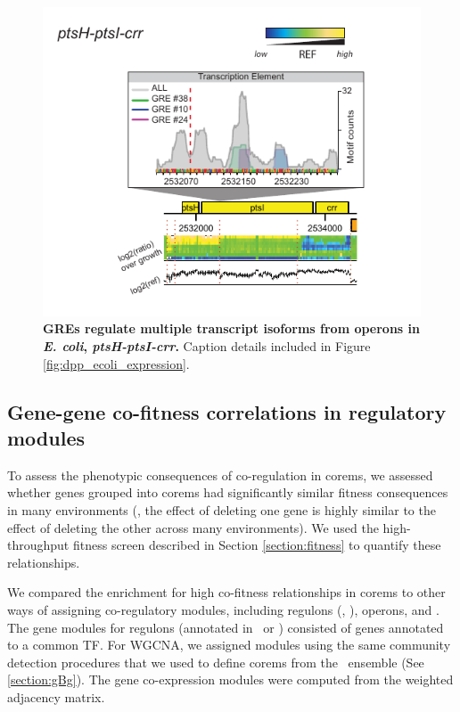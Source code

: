 \begin{figure}[hp]
\centering
\includegraphics[width=0.7\linewidth]{figures/ptsh.pdf}
\caption[GREs regulate multiple transcript isoforms from operons in
  {\it E. coli}, \textit{ptsH-ptsI-crr}]{\textbf{GREs regulate
    multiple transcript isoforms from operons in {\it E. coli},
    \textit{ptsH-ptsI-crr}.} Caption details included in Figure
  \ref{fig:dpp_ecoli_expression}.}
\label{fig:ptsh}
\end{figure}

\subsection{Gene-gene co-fitness correlations in regulatory modules}

To assess the phenotypic consequences of co-regulation in corems, we
assessed whether genes grouped into corems had significantly similar
fitness consequences in many environments (\ie, the effect of deleting
one gene is highly similar to the effect of deleting the other across
many environments). We used the high-throughput fitness screen
described in Section \ref{section:fitness} to quantify these
relationships.

We compared the enrichment for high co-fitness relationships in corems
to other ways of assigning co-regulatory modules, including regulons
(, \rdb), operons, and . The gene
modules for regulons (annotated in \rdb\ or 
\cite{Novichkov2013}) consisted of genes annotated to a common TF. For
WGCNA, we assigned modules using the same community detection
procedures that we used to define corems from the \egrine~ensemble
(See \ref{section:gBg}). The gene co-expression modules were computed
from the weighted  adjacency matrix.

